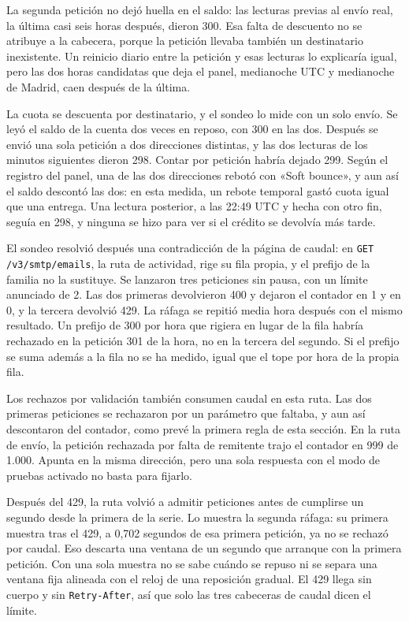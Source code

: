 La segunda petición no dejó huella en el saldo: las lecturas previas al
envío real, la última casi seis horas después, dieron 300. Esa falta de descuento no se
atribuye a la cabecera, porque la petición llevaba también un destinatario
inexistente. Un reinicio diario entre la petición y esas lecturas lo
explicaría igual, pero las dos horas candidatas que deja el panel,
medianoche UTC y medianoche de Madrid, caen después de la última.

La cuota se descuenta por destinatario,
y el sondeo lo mide con un solo envío. Se leyó el saldo de la cuenta dos
veces en reposo, con 300 en las dos. Después se envió una sola petición a
dos direcciones distintas, y las dos lecturas de los minutos siguientes
dieron 298. Contar por petición habría dejado 299. Según el registro del
panel, una de las dos direcciones rebotó con «Soft bounce», y aun así el
saldo descontó las dos: en esta medida, un rebote temporal gastó cuota igual
que una entrega. Una lectura posterior, a las 22:49 UTC y hecha con otro fin, seguía en 298, y ninguna se hizo para ver si el crédito se devolvía más tarde.

El sondeo resolvió después una contradicción de la página de caudal: en
\texttt{GET /v3/smtp/emails}, la ruta de actividad, rige su fila propia, y
el prefijo de la familia no la sustituye. Se lanzaron tres peticiones sin
pausa, con un límite anunciado de 2. Las dos primeras devolvieron 400 y
dejaron el contador en 1 y en 0, y la tercera devolvió 429. La ráfaga se
repitió media hora después con el mismo resultado. Un prefijo de 300 por
hora que rigiera en lugar de la fila habría rechazado en la petición 301 de
la hora, no en la tercera del segundo. Si el prefijo se suma además a la
fila no se ha medido, igual que el tope por hora de la propia fila.

Los rechazos por validación también consumen caudal en esta ruta. Las dos
primeras peticiones se rechazaron por un parámetro que faltaba, y aun así
descontaron del contador, como prevé la primera regla de esta sección.
En la ruta de envío, la petición rechazada por falta de remitente trajo el
contador en 999 de 1.000. Apunta en la misma dirección, pero una sola respuesta con el modo de pruebas activado no basta para fijarlo.

Después del 429, la ruta volvió a admitir peticiones antes de cumplirse un
segundo desde la primera de la serie. Lo muestra la segunda ráfaga: su
primera muestra tras el 429, a 0,702 segundos de esa primera petición, ya
no se rechazó por caudal. Eso descarta una ventana de un segundo que arranque con
la primera petición. Con una sola muestra no se sabe cuándo se repuso ni se
separa una ventana fija alineada con el reloj de una reposición gradual. El
429 llega sin cuerpo y sin \texttt{Retry-After}, así que solo las tres
cabeceras de caudal dicen el límite.

